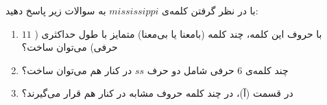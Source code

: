 \EXERCISE
با در نظر گرفتن کلمه‌ی
$mississippi$
به سوالات زیر پاسخ دهید:
\begin{enumerate}
\item
با حروف این کلمه، چند کلمه (بامعنا یا بی‌معنا) متمایز با طول حداکثری (
$11$
حرفی) می‌توان ساخت؟
\item
چند کلمه‌ی
$6$
حرفی شامل دو حرف
$ss$
در کنار هم می‌توان ساخت؟
\item
در قسمت (آ)، در چند کلمه حروف مشابه در کنار هم قرار می‌گیرند؟
\end{enumerate}